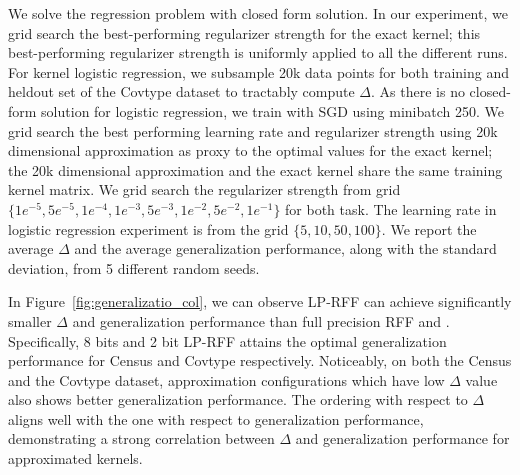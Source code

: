 We solve the regression problem with closed form solution. In our experiment, we grid search the best-performing regularizer strength for the exact kernel; this best-performing regularizer strength is uniformly applied to all the different runs. For kernel logistic regression, we subsample 20k data points for both training and heldout set of the Covtype dataset to tractably compute $\Delta$. As there is no closed-form solution for logistic regression, we train with SGD using minibatch 250. We grid search the best performing learning rate and regularizer strength using 20k dimensional \Nystrom approximation as proxy to the optimal values for the exact kernel; the 20k dimensional \Nystrom approximation and the exact kernel share the same training kernel matrix. We grid search the regularizer strength from grid $\{1e^{-5}, 5e^{-5}, 1e^{-4}, 1e^{-3}, 5e^{-3}, 1e^{-2}, 5e^{-2}, 1e^{-1}\}$ for both task. The learning rate in logistic regression experiment is from the grid $\{5, 10, 50, 100\}$. We report the average $\Delta$ and the average generalization performance, along with the standard deviation, from 5 different random seeds.

In Figure~\ref{fig:generalizatio_col}, we can observe LP-RFF can achieve significantly smaller $\Delta$ and generalization performance than full precision RFF and \Nystrom. Specifically, 8 bits and 2 bit LP-RFF attains the optimal generalization performance for Census and Covtype respectively. Noticeably, on both the Census and the Covtype dataset, approximation configurations which have low $\Delta$ value also shows better generalization performance. The ordering with respect to $\Delta$ aligns well with the one with respect to generalization performance, demonstrating a strong correlation between $\Delta$ and generalization performance for approximated kernels.

